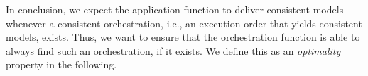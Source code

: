 In conclusion, we expect the application function to deliver consistent models whenever a consistent orchestration, i.e., an execution order that yields consistent models, exists.
Thus, we want to ensure that the orchestration function is able to always find such an orchestration, if it exists.
We define this as an \emph{optimality} property in the following.








